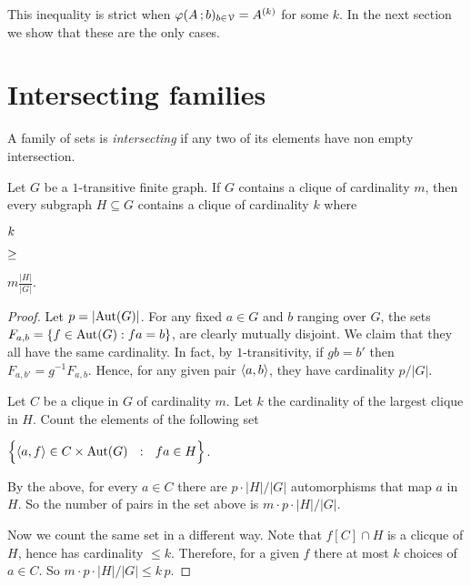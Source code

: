 \documentclass[scombinatorics.tex]{subfiles}
\begin{document}

This inequality is strict when $\varphi(A\,;b)_{b\in\EuScript V}=A^{(k)}$ for some $k$. 
In the next section we show that these are the only cases.



\section{Intersecting families}\label{ErdosKoRado}

A family of sets is \emph{intersecting\/} if any two of its elements have non empty intersection.

\def\medrel#1{\parbox[t]{4ex}{$\displaystyle\hfil #1$}}
\def\ceq#1#2#3{\parbox[t]{20ex}{$\displaystyle #1$}\medrel{#2}{$\displaystyle #3$}}

\begin{lemma}
   Let $G$ be a $1$-transitive finite graph.
   If $G$ contains a clique of cardinality $m$, then every subgraph $H\subseteq G$ contains a clique of cardinality $k$ where 
   
   \ceq{\hfill k}{\ge}{m\frac{|H|}{|G|}.}
\end{lemma}

\begin{proof}
   Let $p=|{\rm Aut\kern.0ex}(G)|$.
   For any fixed $a\in G$ and $b$ ranging over $G$, the sets $F_{a,b}=\{f\in{\rm Aut\kern.0ex}(G): fa=b\}$, are clearly mutually disjoint.
   We claim that they all have the same cardinality. 
   In fact, by $1$-transitivity, if $gb=b'$ then  $F_{a,b'}=g^{-1}F_{a,b}$.
   Hence, for any given pair $\langle a,b\rangle$, they have cardinality $p/|G|$.

   Let $C$ be a clique in $G$ of cardinality $m$.
   Let $k$ the cardinality of the largest clique in $H$.
   Count the elements of the following set
   
   \hfil$\Big\{\<a,f\>\in C\times\Aut(G)\ \ :\ \ fa\in H\Big\}$.

   By the above, for every $a\in C$ there are $p\cdot|H|/|G|$ automorphisms that map $a$ in $H$.
   So the number of pairs in the set above is $m\cdot p\cdot|H|/|G|$.

   Now we count the same set in a different way.
   Note that $f[C]\cap H$ is a clicque of $H$, hence has cardinality $\le k$.
   Therefore, for a given $f$ there at most $k$ choices of $a\in C$.
   So $m\cdot p\cdot|H|/|G|\le k\,p$.
\end{proof}
\end{document}
